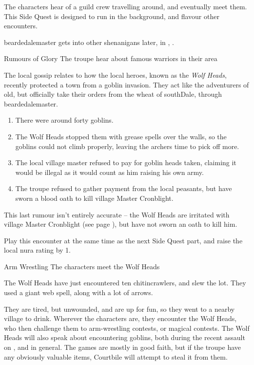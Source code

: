 \label{wolfHeads}

\noindent
The characters hear of a guild crew travelling around, and eventually meet them.
This Side Quest is designed to run in the background, and flavour other encounters.

\Gls{beardedalemaster} gets into other shenanigans later, in , .

{\N \squash Rumours of Glory}%
{The troupe hear about famous warriors in their area}%

The local gossip relates to how the local heroes, known as the \textit{Wolf Heads}, recently protected a town from a goblin invasion.
They act like the adventurers of old, but officially take their orders from the \gls{wheat} of \gls{southDale}, through \gls{beardedalemaster}.

\begin{enumerate}
  \item{There were around forty goblins.}
  \item{The Wolf Heads stopped them with grease spells over the walls, so the goblins could not climb properly, leaving the archers time to pick off more.}
  \item{The local village master refused to pay for goblin heads taken, claiming it would be illegal as it would count as him raising his own army.}
  \item{The troupe refused to gather payment from the local peasants, but have sworn a blood oath to kill \Gls{village} Master Cronblight.}
\end{enumerate}

This last rumour isn't entirely accurate -- the Wolf Heads are irritated with \Gls{village} Master Cronblight (see page \pageref{cronblight}), but have not sworn an oath to kill him.

Play this encounter at the same time as the next Side Quest part, and raise the local nura rating by 1.

{Arm Wrestling}%
{The characters meet the Wolf Heads}%

The Wolf Heads have just encountered ten chitincrawlers, and slew the lot.
They used a giant web spell, along with a lot of arrows.

They are tired, but unwounded, and are up for fun, so they went to a nearby village to drink.
Wherever the characters are, they encounter the Wolf Heads, who then challenge them to arm-wrestling contests, or magical contests.
The Wolf Heads will also speak about encountering goblins, both during the recent assault on , and in general.
The games are mostly in good faith, but if the troupe have any obviously valuable items, Courtbile will attempt to steal it from them.

